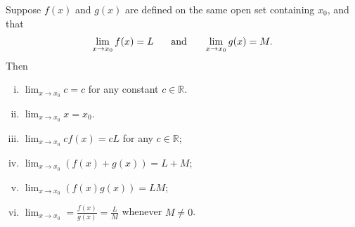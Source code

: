 \documentclass[12pt,letterpaper,reqno]{article}
\numberwithin{equation}{section}
\newcommand{\R}{\ensuremath{\mathbb R}}
\begin{document}
{\begin{thm}\label{thm:limit_laws_for_single-variable_functions}
Suppose $f(x)$ and $g(x)$ are defined on the same open set containing $x_0$, and that 
\begin{align*}
	\lim_{x \to x_0}f(x)=L \hspace{0.5cm} \text{ and } \hspace{0.5cm} \lim_{x \to x_0}g(x)=M.
\end{align*}
Then
	\begin{enumerate}[(i)]
		\item $\lim_{x \to x_0}c=c$ for any constant $c \in \R$.
		\item $\lim_{x \to x_0}x=x_0$.
		\item $\lim_{x \to x_0} cf(x)=cL$ for any $c \in \R$;
		\item $\lim_{x \to x_0}(f(x)+ g(x))=L+M$;
		\item $\lim_{x \to x_0}(f(x)g(x))=LM$;
		\item $\lim_{x \to x_0}=\frac{f(x)}{g(x)}=\frac{L}{M}$ whenever $M \neq 0$.
	\end{enumerate}
\end{thm}

}
\end{document}

